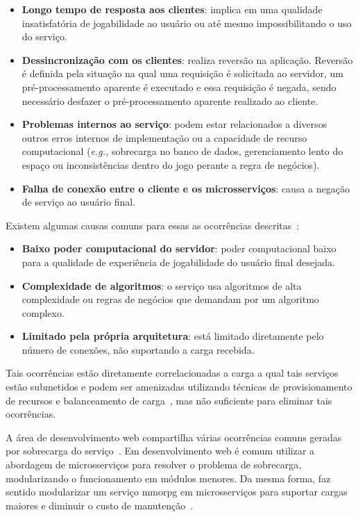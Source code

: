 \begin{itemize}
  \item \textbf{Longo tempo de resposta aos clientes}: implica em uma qualidade insatisfatória de jogabilidade ao usuário ou até mesmo impossibilitando o uso do serviço.
  \item \textbf{Dessincronização com os clientes}: realiza reversão na aplicação. Reversão é definida pela situação na qual uma requisição é solicitada ao servidor, um pré-processamento aparente é executado e essa requisição é negada, sendo necessário desfazer o pré-processamento aparente realizado ao cliente.
  \item \textbf{Problemas internos ao serviço}:  podem estar relacionados a diversos outros erros internos de implementação ou a capacidade de recurso computacional (\textit{e.g.,} sobrecarga no banco de dados, gerenciamento lento do espaço ou inconsistências dentro do jogo perante a regra de negócios).
  \item \textbf{Falha de conexão entre o cliente e os microsserviços}: causa a negação de serviço ao usuário final.
\end{itemize}



Existem algumas causas comuns para essas as ocorrências descritas~\cite{1417630}:



\begin{itemize}
  \item \textbf{Baixo poder computacional do servidor}: poder computacional baixo para a qualidade de experiência de jogabilidade do usuário final desejada.
  \item \textbf{Complexidade de algoritmos}: o serviço usa algoritmos de alta complexidade ou regras de negócios que demandam por um algoritmo complexo.
  \item \textbf{Limitado pela própria arquitetura}: está limitado diretamente pelo número de conexões, não suportando a carga recebida.
\end{itemize}



Tais ocorrências estão diretamente correlacionadas a carga a qual tais serviços estão submetidos e podem ser amenizadas utilizando técnicas de provisionamento de recursos e balanceamento de carga~\cite{1417630}, mas não suficiente para eliminar tais ocorrências.

A área de desenvolvimento web compartilha várias ocorrências comuns geradas por sobrecarga do serviço~\cite{7830692}.
%
Em desenvolvimento web é comum utilizar a abordagem de microsserviços para resolver o problema de sobrecarga, modularizando o  funcionamento em módulos menores.
%
Da mesma forma, faz sentido modularizar um serviço \ac{mmorpg} em microsserviços para suportar cargas maiores e diminuir o custo de manutenção~\cite{7515686}.



